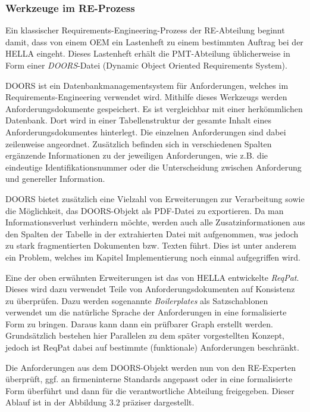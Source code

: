 \documentclass[12pt]{report}
\begin{document}
\subsubsection{Werkzeuge im RE-Prozess}
Ein klassischer Requirements-Engineering-Prozess der RE-Abteilung beginnt damit, dass von einem OEM ein Lastenheft zu einem bestimmten Auftrag bei der HELLA eingeht. Dieses Lastenheft erhält die PMT-Abteilung üblicherweise in Form einer \textit{DOORS}-Datei (Dynamic Object Oriented Requirements System). 

DOORS ist ein Datenbankmanagementsystem für Anforderungen, welches  im Requirements-Engineering verwendet wird. Mithilfe dieses Werkzeugs werden Anforderungsdokumente gespeichert. Es ist vergleichbar mit einer herkömmlichen Datenbank. Dort wird in einer Tabellenstruktur der gesamte Inhalt eines Anforderungsdokumentes hinterlegt. Die einzelnen Anforderungen sind dabei zeilenweise angeordnet. Zusätzlich befinden sich in verschiedenen Spalten ergänzende Informationen zu der jeweiligen Anforderungen, wie z.B. die eindeutige Identifikationsnummer oder die Unterscheidung zwischen Anforderung und genereller Information.

DOORS bietet zusätzlich eine Vielzahl von Erweiterungen zur Verarbeitung sowie die Möglichkeit, das DOORS-Objekt als PDF-Datei zu exportieren. Da man Informationsverlust verhindern möchte, werden auch alle Zusatzinformationen aus den Spalten der Tabelle in der extrahierten Datei mit aufgenommen, was jedoch zu stark fragmentierten Dokumenten bzw. Texten führt. Dies ist unter anderem ein Problem, welches im Kapitel Implementierung noch einmal aufgegriffen wird. 

Eine der oben erwähnten Erweiterungen ist das von HELLA entwickelte \textit{ReqPat}. Dieses wird dazu verwendet Teile von Anforderungsdokumenten auf Konsistenz zu überprüfen. Dazu werden sogenannte \textit{Boilerplates} als Satzschablonen verwendet um die natürliche Sprache der Anforderungen in eine formalisierte Form zu bringen. Daraus kann dann ein prüfbarer Graph erstellt werden. Grundsätzlich bestehen hier Parallelen zu dem später vorgestellten Konzept, jedoch ist ReqPat dabei auf bestimmte (funktionale) Anforderungen beschränkt. 

Die Anforderungen aus dem DOORS-Objekt werden nun von den RE-Experten überprüft, ggf. an firmeninterne Standards angepasst oder in eine formalisierte Form überführt und dann für die verantwortliche Abteilung freigegeben. Dieser Ablauf ist in der Abbildung 3.2 präziser dargestellt.
\end{document}

